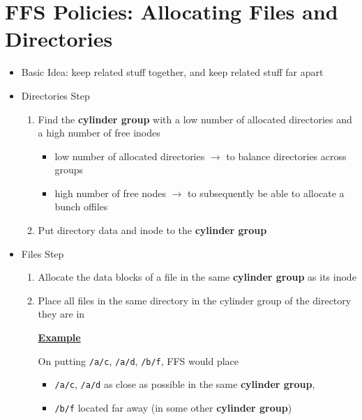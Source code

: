 \documentclass[12pt]{article}
\begin{document}
\section*{FFS Policies: Allocating Files and Directories}

\begin{itemize}
    \item Basic Idea: keep related stuff together, and keep related stuff
    far apart
    \item Directories Step

    \begin{enumerate}[1)]
        \item Find the \textbf{cylinder group} with a low number of allocated directories
        and a high number of free inodes

        \begin{itemize}
            \item low number of allocated directories $\to$ to balance directories
            across groups
            \item high number of free nodes $\to$ to subsequently be able to allocate a bunch offiles
        \end{itemize}
        \item Put directory data and inode to the \textbf{cylinder group}
    \end{enumerate}

    \item Files Step

    \begin{enumerate}[1)]
        \item Allocate the data blocks of a file in the same \textbf{cylinder group} as its inode
        \item Place all files in the same directory in the cylinder group of the directory they are in

        \bigskip

        \underline{\textbf{Example}}

        \bigskip

        On putting \texttt{/a/c}, \texttt{/a/d}, \texttt{/b/f}, FFS would place

        \begin{itemize}
            \item \texttt{/a/c}, \texttt{/a/d} as close as possible in the same \textbf{cylinder group},
            \item \texttt{/b/f} located far away (in some other \textbf{cylinder group})
        \end{itemize}
    \end{enumerate}
\end{itemize}
\end{document}
